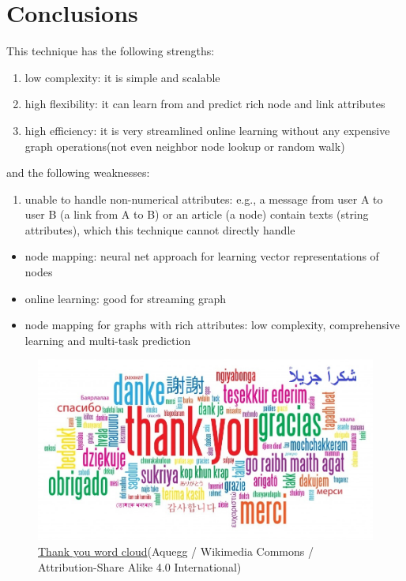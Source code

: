 \documentclass{article}
\begin{document}
\section{Conclusions}
This technique has the following strengths:
\begin{enumerate}
	\item low complexity: it is simple and scalable
	\item high flexibility: it can learn from and predict rich node and link 
	attributes
	\item high efficiency: it is very streamlined online learning without any 
	expensive graph operations(not even neighbor node lookup or random walk)
\end{enumerate}
and the following weaknesses:
\begin{enumerate}
	\item unable to handle non-numerical attributes: e.g., a message from user 
	A to user B (a link from A to B) or an article (a node) contain texts 
	(string attributes), which this technique cannot directly handle
\end{enumerate}
\begin{itemize}
	\item node mapping: neural net approach for learning vector 
	representations of nodes
	\item online learning: good for streaming graph
	\item node mapping for graphs with rich attributes: low complexity, 
	comprehensive learning and multi-task prediction
\end{itemize}
\begin{figure}[H]
	\centering
	\includegraphics[width=\linewidth]{Thank-you-word-cloud}
	\caption{ 
	\href{https://commons.wikimedia.org/wiki/File:Spectrogram-19thC.png}{Thank 
	you word cloud}(Aquegg / Wikimedia Commons / Attribution-Share Alike 4.0 
	International)}
	\label{fig:Thank-you-word-cloud}
\end{figure}



\end{document}
